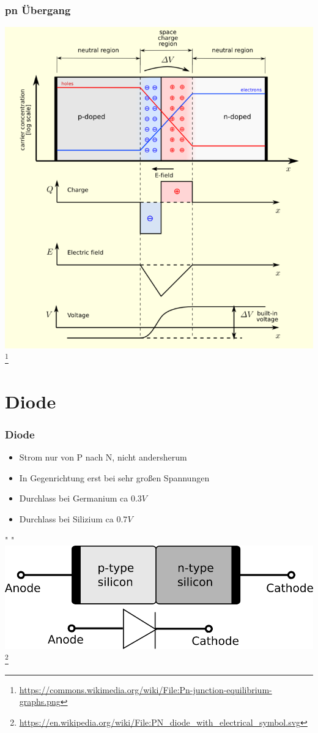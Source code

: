 \begin{frame}
    \frametitle{pn Übergang}
    \begin{center}
        \includegraphics[height=.9\textheight]{e12/pn-Diagram.png}
        \footnote{\tiny \url{https://commons.wikimedia.org/wiki/File:Pn-junction-equilibrium-graphs.png}}
	\end{center}
\end{frame}

\section*{Diode}

\begin{frame}
    \frametitle{Diode}
    \begin{center}
    \begin{itemize}
			\item Strom nur von P nach N, nicht andersherum
			\item In Gegenrichtung erst bei sehr großen Spannungen
			\item Durchlass bei Germanium ca $0.3V$
			\item Durchlass bei Silizium ca $0.7V$
    \end{itemize} " "\\
        \includegraphics[width=.7\textwidth]{e12/diode_with_electrical_symbol.png}
        \footnote{\tiny \url{https://en.wikipedia.org/wiki/File:PN_diode_with_electrical_symbol.svg}}
	\end{center}
\end{frame}

